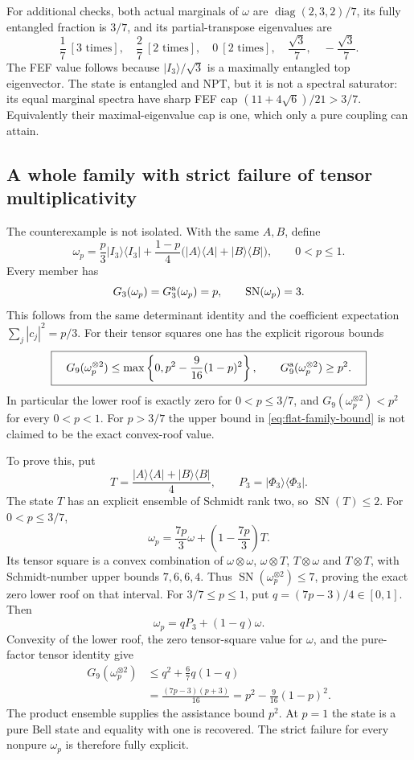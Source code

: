 For additional checks, both actual marginals of $\omega$ are
$\operatorname{diag}(2,3,2)/7$, its fully entangled fraction is $3/7$,
and its partial-transpose eigenvalues are
\[
       \frac17\ [3\text{ times}],\quad
       \frac27\ [2\text{ times}],\quad
       0\ [2\text{ times}],\quad
       \frac{\sqrt3}{7},\quad-\frac{\sqrt3}{7}.
\]
The FEF value follows because $|I_3\rangle/\sqrt3$ is a maximally
entangled top eigenvector. The state is entangled and NPT, but it is
not a spectral saturator: its equal marginal spectra have sharp FEF
cap $(11+4\sqrt6)/21>3/7$. Equivalently their maximal-eigenvalue cap
is one, which only a pure coupling can attain.

\subsection{A whole family with strict failure of tensor multiplicativity}

The counterexample is not isolated. With the same $A,B$, define
\[
 \omega_p=\frac p3|I_3\rangle\langle I_3|
       +\frac{1-p}{4}\bigl(|A\rangle\langle A|+|B\rangle\langle B|\bigr),
                  \qquad 0<p\le1.
\]
Every member has
\[
       G_3(\omega_p)=G_3^{\rm a}(\omega_p)=p,
       \qquad \operatorname{SN}(\omega_p)=3.
\]
This follows from the same determinant identity and the coefficient
expectation $\sum_j|c_j|^2=p/3$.
For their tensor squares one has the explicit rigorous bounds
\begin{equation}\label{eq:flat-family-bound}
 \boxed{\quad
 G_9(\omega_p^{\otimes2})
       \le\max\left\{0,p^2-\frac9{16}(1-p)^2\right\},
       \qquad G_9^{\rm a}(\omega_p^{\otimes2})\ge p^2.
 \quad}
\end{equation}
In particular the lower roof is exactly zero for $0<p\le3/7$,
and $G_9(\omega_p^{\otimes2})<p^2$ for every $0<p<1$.
For $p>3/7$ the upper bound in \eqref{eq:flat-family-bound} is not claimed
to be the exact convex-roof value.

To prove this, put
\[
 T=\frac{|A\rangle\langle A|+|B\rangle\langle B|}{4},
 \qquad P_3=|\Phi_3\rangle\langle\Phi_3|.
\]
The state $T$ has an explicit ensemble of Schmidt rank two, so
$\operatorname{SN}(T)\le2$. For $0<p\le3/7$,
\[
       \omega_p=\frac{7p}{3}\omega
                      +\left(1-\frac{7p}{3}\right)T.
\]
Its tensor square is a convex combination of
$\omega\otimes\omega$, $\omega\otimes T$, $T\otimes\omega$ and
$T\otimes T$, with Schmidt-number upper bounds $7,6,6,4$.
Thus $\operatorname{SN}(\omega_p^{\otimes2})\le7$, proving the exact
zero lower roof on that interval.
For $3/7\le p\le1$, put $q=(7p-3)/4\in[0,1]$. Then
\[
                   \omega_p=qP_3+(1-q)\omega.
\]
Convexity of the lower roof, the zero tensor-square value for $\omega$,
and the pure-factor tensor identity give
\[
 \begin{aligned}
 G_9(\omega_p^{\otimes2})
  &\le q^2+\frac67q(1-q)\\
  &=\frac{(7p-3)(p+3)}{16}
    =p^2-\frac9{16}(1-p)^2.
 \end{aligned}
\]
The product ensemble supplies the assistance bound $p^2$. At $p=1$ the
state is a pure Bell state and equality with one is recovered. The
strict failure for every nonpure $\omega_p$ is therefore fully explicit.

